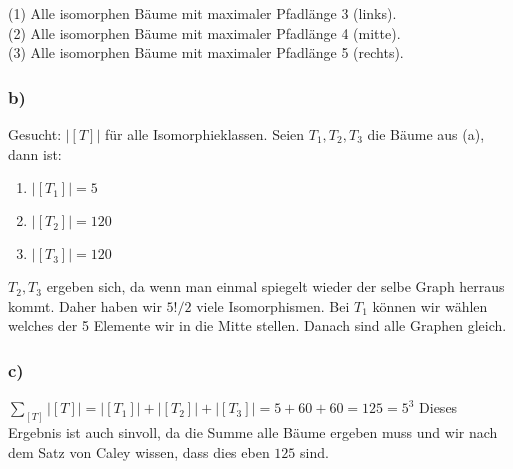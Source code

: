 \documentclass[11pt,a4paper,ngerman]{article}
\begin{document}
(1) Alle isomorphen Bäume mit maximaler Pfadlänge 3 (links).\\
(2) Alle isomorphen Bäume mit maximaler Pfadlänge 4 (mitte).\\
(3) Alle isomorphen Bäume mit maximaler Pfadlänge 5 (rechts).
\subsubsection*{b)}
Gesucht: $|[T]|$ für alle Isomorphieklassen.
Seien $T_1, T_2, T_3$ die Bäume aus (a), dann ist:
\begin{enumerate}
\item $|[T_1]| = 5$
\item $|[T_2]| = 120$
\item $|[T_3]| = 120$ 
\end{enumerate}
$T_2, T_3$ ergeben sich, da wenn man einmal spiegelt wieder der selbe Graph herraus kommt. Daher haben wir $5! / 2$ viele
Isomorphismen. Bei $T_1$ können wir wählen welches der 5 Elemente wir in die Mitte stellen. Danach sind alle Graphen gleich.
\subsubsection*{c)}

$\sum_{[T]} |[T]| = |[T_1]| + |[T_2]| + |[T_3]| = 5 + 60 + 60 = 125 = 5^3$
Dieses Ergebnis ist auch sinvoll, da die Summe alle Bäume ergeben muss und wir nach dem Satz von Caley
wissen, dass dies eben $125$ sind. 

\label{LastPage}
\end{document}
